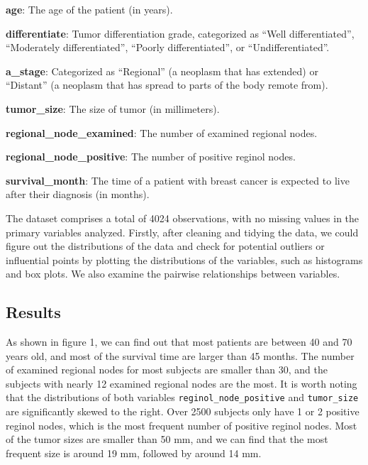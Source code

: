 \documentclass[
]{article}
\begin{document}
\textbf{age}: The age of the patient (in years).

\textbf{differentiate}: Tumor differentiation grade, categorized as
``Well differentiated'', ``Moderately differentiated'', ``Poorly
differentiated'', or ``Undifferentiated''.

\textbf{a\_stage}: Categorized as ``Regional'' (a neoplasm that has
extended) or ``Distant'' (a neoplasm that has spread to parts of the
body remote from).

\textbf{tumor\_size}: The size of tumor (in millimeters).

\textbf{regional\_node\_examined}: The number of examined regional
nodes.

\textbf{regional\_node\_positive}: The number of positive reginol nodes.

\textbf{survival\_month}: The time of a patient with breast cancer is
expected to live after their diagnosis (in months).

The dataset comprises a total of 4024 observations, with no missing
values in the primary variables analyzed. Firstly, after cleaning and
tidying the data, we could figure out the distributions of the data and
check for potential outliers or influential points by plotting the
distributions of the variables, such as histograms and box plots. We
also examine the pairwise relationships between variables.

\subsection{Results}\label{results}

As shown in figure 1, we can find out that most patients are between 40
and 70 years old, and most of the survival time are larger than 45
months. The number of examined regional nodes for most subjects are
smaller than 30, and the subjects with nearly 12 examined regional nodes
are the most. It is worth noting that the distributions of both
variables \texttt{reginol\_node\_positive} and \texttt{tumor\_size} are
significantly skewed to the right. Over 2500 subjects only have 1 or 2
positive reginol nodes, which is the most frequent number of positive
reginol nodes. Most of the tumor sizes are smaller than 50 mm, and we
can find that the most frequent size is around 19 mm, followed by around
14 mm.
\end{document}
